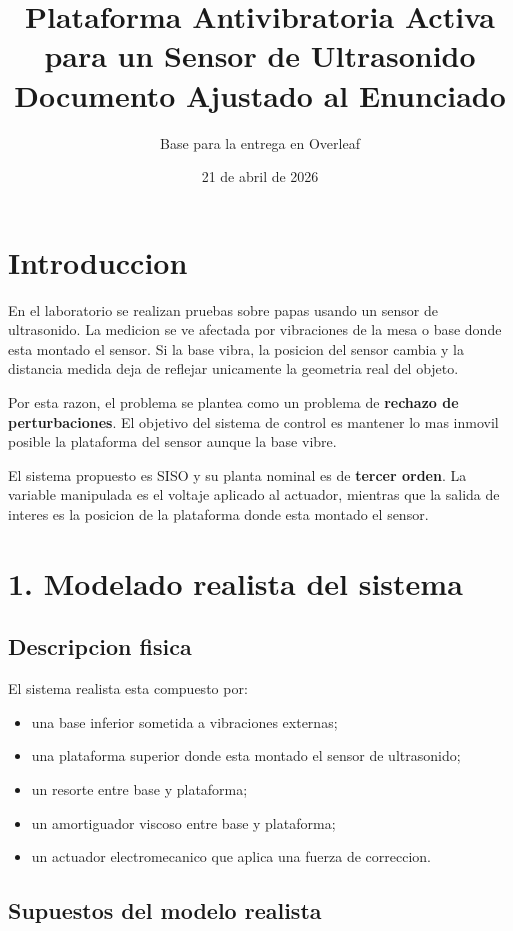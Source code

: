 \documentclass[11pt]{article}
\title{Plataforma Antivibratoria Activa para un Sensor de Ultrasonido\\Documento Ajustado al Enunciado}
\author{Base para la entrega en Overleaf}
\date{21 de abril de 2026}
\begin{document}
\maketitle
\tableofcontents
\newpage

\section{Introduccion}

En el laboratorio se realizan pruebas sobre papas usando un sensor de ultrasonido. La medicion se ve afectada por vibraciones de la mesa o base donde esta montado el sensor. Si la base vibra, la posicion del sensor cambia y la distancia medida deja de reflejar unicamente la geometria real del objeto.

Por esta razon, el problema se plantea como un problema de \textbf{rechazo de perturbaciones}. El objetivo del sistema de control es mantener lo mas inmovil posible la plataforma del sensor aunque la base vibre.

El sistema propuesto es SISO y su planta nominal es de \textbf{tercer orden}. La variable manipulada es el voltaje aplicado al actuador, mientras que la salida de interes es la posicion de la plataforma donde esta montado el sensor.

\section{1. Modelado realista del sistema}

\subsection{Descripcion fisica}

El sistema realista esta compuesto por:

\begin{itemize}[leftmargin=1.2cm]
\item una base inferior sometida a vibraciones externas;
\item una plataforma superior donde esta montado el sensor de ultrasonido;
\item un resorte entre base y plataforma;
\item un amortiguador viscoso entre base y plataforma;
\item un actuador electromecanico que aplica una fuerza de correccion.
\end{itemize}

\subsection{Supuestos del modelo realista}
\end{document}

